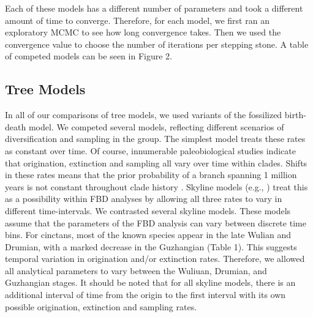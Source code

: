 \documentclass{article}
\begin{document}
Each of these models has a different number of parameters and took a different amount of time to converge. Therefore, for each model, we first ran an exploratory MCMC to see how long convergence takes. Then we used the convergence value to choose the number of iterations per stepping stone.
A table of competed models can be seen in Figure 2.

\subsection{Tree Models}

In all of our comparisons of tree models, we used variants of the fossilized birth-death model.
We competed several models, reflecting different scenarios of diversification and sampling in the group.
The simplest model treats these rates as constant over time.  
Of course, innumerable paleobiological studies indicate that origination, extinction and sampling all vary over time within clades.  Shifts in these rates means that the prior probability of a branch spanning 1 million years is not constant throughout clade history \citep{Wagner2019}. %
Skyline models (e.g., \citep{Stadler2013b}) treat this as a possibility within FBD analyses by allowing all three rates to vary in different time-intervals. 
We contrasted several skyline models.%
These models assume that the parameters of the FBD analysis can vary between discrete time bins.
For cinctans, most of the known species appear in the late Wulian and Drumian, with a marked decrease in the Guzhangian (Table 1).  This suggests temporal variation in origination and/or extinction rates.
Therefore, we allowed all analytical parameters to vary between the Wuliuan, Drumian, and Guzhangian stages.
It should be noted that for all skyline models, there is an additional interval of time from the origin to the first interval with its own possible origination, extinction and sampling rates.
\end{document}
